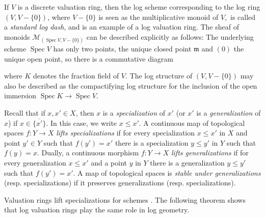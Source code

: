 \documentclass[10pt]{amsart}
\DeclareMathOperator{\Spec}{Spec}
\newcommand{\ol}{\overline}
\begin{document}
\begin{example}\cite[Example III.1.5.6]{Ogu}
\label{exm:logvaluationring}
If $V$ is a discrete valuation ring, then the log scheme corresponding to the log ring $(V, V-\{0\})$, where $V-\{0\}$ is seen as the multiplicative monoid of $V,$ is called a \emph{standard log dash}, and is an example of a log valuation ring.
The sheaf of monoids $\mathcal{M}_{(\Spec{V,V-\{0\}})}$ can be described explicitly as follows: The underlying scheme $\Spec{V}$ has only two points, 
the unique closed point $\mathfrak{m}$ and $(0)$ the unique open point, 
so there is a commutative diagram
\begin{center}
\end{center}
where $K$ denotes the fraction field of $V$. 
The log structure of $(V, V-\{0\})$ may also be described as the compactifying log structure 
for the inclusion of the open immersion $\Spec K \to \Spec V$.
\end{example}

Recall that if $x,x' \in X$, then $x$ is a \emph{specialization} of $x'$
(or $x'$ is a \emph{generalization} of $x$) if $x \in \ol{\{x'\}}.$ 
In this case, we write $x \leq x'$. 
A continuous map of topological spaces
$f \colon Y \to X$ \emph{lifts specializations} if for every specialization $x \leq x'$ in $X$ and point $y' \in Y$ such that $f(y') = x'$ there is a specialization $y\leq y'$ in $Y$ such that $f(y) = x.$ Dually, a continuous morphism $f \colon Y \to X$ \emph{lifts generalizations} if for every generalization $x \leq x'$ and a point $y$ in $Y$ there is a generalization $y \leq y'$ such that $f(y') = x'.$ A map of topological spaces is \emph{stable under generalizations} (resp. specializations) if it preserves 
generalizations (resp. specializations).


Valuation rings lift specializations for schemes \cite[Tag 01J8]{stacks-project}. 
The following theorem shows that log valuation rings play the same role in log geometry.
\end{document}
